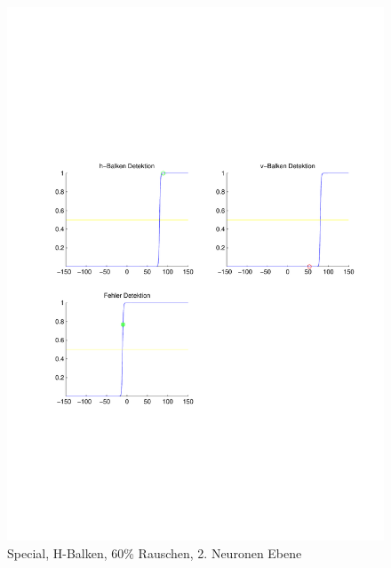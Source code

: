 \begin{figure}[hbt]
\begin{minipage}{0.8 \textwidth}
		\includegraphics[width=\textwidth]{./Bilder/Auswertung/Endergebnis/TypeSpecial_Rauschen60_H_Line_Layer2}
		\caption{Special, H-Balken, 60\% Rauschen, 2. Neuronen Ebene}
		\label{Special_H_60_2}
	\end{minipage}
\end{figure}


